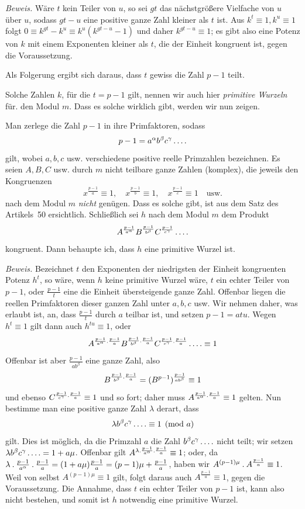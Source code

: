 %
\emph{Beweis.} Wäre $t$ kein Teiler von $u$, so sei $gt$ das nächstgrößere Vielfache von $u$ über $u$, sodass $gt-u$ eine positive ganze Zahl kleiner als $t$ ist. Aus $k^t\equiv1,k^u\equiv1$ folgt $0\equiv k^{gt}-k^u\equiv k^u(k^{gt-u}-1)$ und daher $k^{gt-u}\equiv1$; es gibt also eine Potenz von $k$ mit einem Exponenten kleiner als $t$, die der Einheit kongruent ist, gegen die Voraussetzung.

Als Folgerung ergibt sich daraus, dass $t$ gewiss die Zahl $p-1$ teilt.

Solche Zahlen $k$, für die $t=p-1$ gilt, nennen wir auch hier \emph{primitive Wurzeln} für. den Modul $m$. Dass es solche wirklich gibt, werden wir nun zeigen.

Man zerlege die Zahl $p-1$ in ihre Primfaktoren, sodass
\[
p-1=a^\alpha b^\beta c^\gamma\mathinner{.\,.\,.\,.}
\]
gilt, wobei $a,b,c$ usw. verschiedene positive reelle Primzahlen bezeichnen. Es seien $A,B,C$ usw. durch $m$ nicht teilbare ganze Zahlen (komplex), die jeweils den Kongruenzen
\[
x^{\frac{p-1}a}\equiv1,\quad x^{\frac{p-1}b}\equiv1,\quad x^{\frac{p-1}c}\equiv1\quad\text{usw.}
\]
nach dem Modul $m$ \emph{nicht} genügen. Dass es solche gibt, ist aus dem Satz des Artikels~50 ersichtlich. Schließlich sei $h$ nach dem Modul $m$ dem Produkt
\[
A^{\frac{p-1}{a^\alpha}}B^{\frac{p-1}{b^\beta}}C^{\frac{p-1}{c^\gamma}}\mathinner{.\,.\,.\,.}
\]
kongruent. Dann behaupte ich, dass $h$ eine primitive Wurzel ist.

\emph{Beweis.} Bezeichnet $t$ den Exponenten der niedrigsten der Einheit kongruenten Potenz $h^t$, so wäre, wenn $h$ keine primitive Wurzel wäre, $t$ ein echter Teiler von $p-1$, oder $\frac{p-1}t$ eine die Einheit übersteigende ganze Zahl. Offenbar liegen die reellen Primfaktoren dieser ganzen Zahl unter $a,b,c$ usw. Wir nehmen daher, was erlaubt ist, an, dass $\frac{p-1}t$ durch $a$ teilbar ist, und setzen $p-1=atu$. Wegen $h^t\equiv1$ gilt dann auch $h^{tu}\equiv1$, oder
\[
A^{\frac{p-1}{a^\alpha}\mathbin{.}\frac{p-1}a}B^{\frac{p-1}{b^\beta}\mathbin{.}\frac{p-1}a}C^{\frac{p-1}{c^\gamma}\mathbin{.}\frac{p-1}a}\mathinner{.\,.\,.\,.}\equiv1
\]
Offenbar ist aber $\frac{p-1}{ab^\beta}$ eine ganze Zahl, also
\[
B^{\frac{p-1}{b^\beta}\mathbin{.}\frac{p-1}a}=(B^{p-1})^{\frac{p-1}{ab^\beta}}\equiv1
\]
und ebenso
%
$C^{\frac{p-1}{c^\gamma}\mathbin{.}\frac{p-1}a}\equiv1$ und so fort; daher muss $A^{\frac{p-1}{a^\alpha}\mathbin{.}\frac{p-1}a}\equiv1$ gelten.
Nun bestimme man eine positive ganze Zahl $\lambda$ derart, dass
\[
\lambda b^\beta c^\gamma\mathinner{.\,.\,.\,.}\equiv1\pmod a
\]
gilt. Dies ist möglich, da die Primzahl $a$ die Zahl $b^\beta c^\gamma\mathinner{.\,.\,.\,.}$ nicht teilt; wir setzen $\lambda b^\beta c^\gamma\mathinner{.\,.\,.\,.}=1+a\mu$. Offenbar gilt $A^{\lambda\mathbin{.}\frac{p-1}{a^\alpha}\mathbin{.}\frac{p-1}a}\equiv1$; oder, da $\lambda\mathbin{.}\frac{p-1}{a^\alpha}\mathbin{.}\frac{p-1}a=(1+a\mu)\frac{p-1}a=(p-1)\mu+\frac{p-1}a$, haben wir $A^{(p-1)\mu}\mathbin{.} A^{\frac{p-1}a}\equiv1$. Weil von selbst $A^{(p-1)\mu}\equiv1$ gilt, folgt daraus auch $A^{\frac{p-1}a}\equiv1$, gegen die Voraussetzung. Die Annahme, dass $t$ ein echter Teiler von $p-1$ ist, kann also nicht bestehen, und somit ist $h$ notwendig eine primitive Wurzel.


